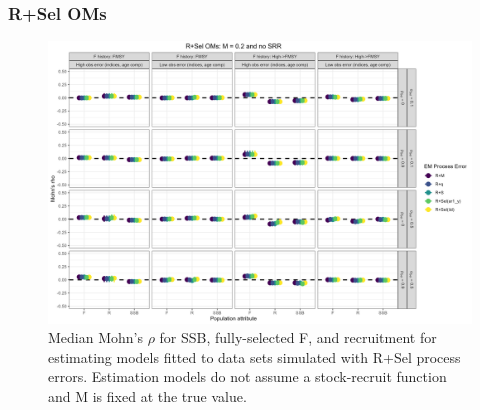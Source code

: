 \documentclass[
  12pt,
]{article}
\begin{document}
\hypertarget{rsel-oms-1}{%
\subsubsection*{R+Sel OMs}\label{rsel-oms-1}}

\begin{landscape}
\begin{figure}
\caption{Median Mohn's $\rho$ for SSB, fully-selected F, and recruitment for estimating models fitted to data sets simulated with R+Sel process errors.  Estimation models do not assume a stock-recruit function and M is fixed at the true value.}\label{Sel_om_em_R_MF_mohns_rho}
\begin{center}
\includegraphics[width = \textwidth]{Sel_om_mohns_rho_R_MF.png}
\end{center}
\end{figure}
\end{landscape}
\end{document}
